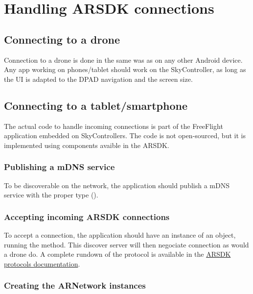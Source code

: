 \section{Handling ARSDK connections}

\subsection{Connecting to a drone}

Connection to a drone is done in the same was as on any other Android device. Any app working on phones/tablet should work on the SkyController, as long as the UI is adapted to the DPAD navigation and the screen size.

\subsection{Connecting to a tablet/smartphone}

The actual code to handle incoming connections is part of the FreeFlight application embedded on SkyControllers. The code is not open-sourced, but it is implemented using components avaible in the ARSDK.

\subsubsection{Publishing a mDNS service}

To be discoverable on the network, the application should publish a mDNS service with the proper type ().

\subsubsection{Accepting incoming ARSDK connections}

To accept a connection, the application should have an instance of an  object, running the  method. This discover server will then negociate connection as would a drone do. A complete rundown of the  protocol is available in the \href{http://developer.parrot.com//docs/bebop/ARSDK_Protocols.pdf}{ARSDK protocols documentation}.

\subsubsection{Creating the ARNetwork instances}

